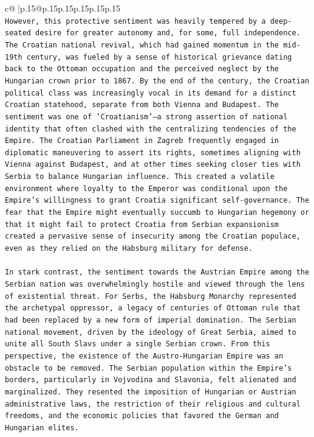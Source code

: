 \documentclass{article}
\begin{document}
{\begin{supertabular}{c@{$\;$}|p{.15\linewidth}@{}p{.15\linewidth}p{.15\linewidth}p{.15\linewidth}p{.15\linewidth}p{.15\linewidth}}
{{{\\ 
\texttt{However, this protective sentiment was heavily tempered by a deep{-}seated desire for greater autonomy and, for some, full independence. The Croatian national revival, which had gained momentum in the mid{-}19th century, was fueled by a sense of historical grievance dating back to the Ottoman occupation and the perceived neglect by the Hungarian crown prior to 1867. By the end of the century, the Croatian political class was increasingly vocal in its demand for a distinct Croatian statehood, separate from both Vienna and Budapest. The sentiment was one of 'Croatianism'—a strong assertion of national identity that often clashed with the centralizing tendencies of the Empire. The Croatian Parliament in Zagreb frequently engaged in diplomatic maneuvering to assert its rights, sometimes aligning with Vienna against Budapest, and at other times seeking closer ties with Serbia to balance Hungarian influence. This created a volatile environment where loyalty to the Emperor was conditional upon the Empire's willingness to grant Croatia significant self{-}governance. The fear that the Empire might eventually succumb to Hungarian hegemony or that it might fail to protect Croatia from Serbian expansionism created a pervasive sense of insecurity among the Croatian populace, even as they relied on the Habsburg military for defense.} \\
\\ 
\texttt{In stark contrast, the sentiment towards the Austrian Empire among the Serbian nation was overwhelmingly hostile and viewed through the lens of existential threat. For Serbs, the Habsburg Monarchy represented the archetypal oppressor, a legacy of centuries of Ottoman rule that had been replaced by a new form of imperial domination. The Serbian national movement, driven by the ideology of Great Serbia, aimed to unite all South Slavs under a single Serbian crown. From this perspective, the existence of the Austro{-}Hungarian Empire was an obstacle to be removed. The Serbian population within the Empire's borders, particularly in Vojvodina and Slavonia, felt alienated and marginalized. They resented the imposition of Hungarian or Austrian administrative laws, the restriction of their religious and cultural freedoms, and the economic policies that favored the German and Hungarian elites.} \\
\\ 
}}}
\end{supertabular}}
\end{document}
